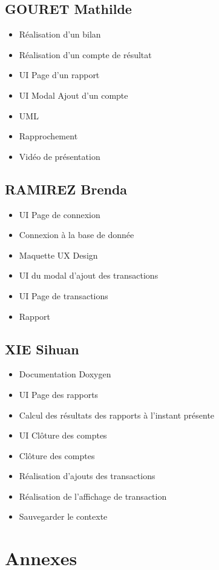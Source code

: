 \documentclass[10pt,a4paper,openany]{report}
\begin{document}
	\subsection{GOURET Mathilde}
	\begin{itemize}
		\item Réalisation d'un bilan
		\item Réalisation d'un compte de résultat
		\item UI Page d'un rapport
		\item UI Modal Ajout d'un compte
		\item UML 
		\item Rapprochement
		\item Vidéo de présentation	
	\end{itemize}
	\subsection{RAMIREZ Brenda}
	\begin{itemize}
		\item UI Page de connexion
		\item Connexion à la base de donnée
		\item Maquette UX Design
		\item UI du modal d'ajout des transactions
		\item UI Page de transactions
		\item Rapport
	\end{itemize}
	\subsection{XIE Sihuan}
	\begin{itemize}
		\item Documentation Doxygen
		\item UI Page des rapports
		\item Calcul des résultats des rapports à l'instant présente
		\item UI Clôture des comptes
		\item Clôture des comptes
		\item Réalisation d'ajouts des transactions
		\item Réalisation de l'affichage de transaction
		\item Sauvegarder le contexte
	\end{itemize}

	\section{Annexes}
\end{document}
